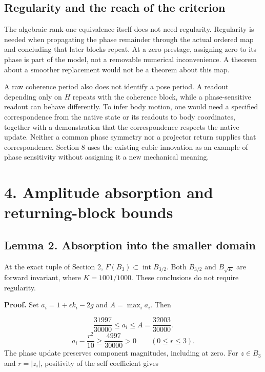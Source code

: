 \documentclass[11pt,a4paper]{article}
\begin{document}
\subsection*{Regularity and the reach of the criterion}
The algebraic rank-one equivalence itself does not need regularity. Regularity is needed when propagating the phase remainder through the actual ordered map and concluding that later blocks repeat. At a zero prestage, assigning zero to its phase is part of the model, not a removable numerical inconvenience. A theorem about a smoother replacement would not be a theorem about this map.

A raw coherence period also does not identify a pose period. A readout depending only on $H$ repeats with the coherence block, while a phase-sensitive readout can behave differently. To infer body motion, one would need a specified correspondence from the native state or its readouts to body coordinates, together with a demonstration that the correspondence respects the native update. Neither a common phase symmetry nor a projector return supplies that correspondence. Section 8 uses the existing cubic innovation as an example of phase sensitivity without assigning it a new mechanical meaning.

\clearpage
\section*{4. Amplitude absorption and returning-block bounds}
\subsection*{Lemma 2. Absorption into the smaller domain}
At the exact tuple of Section 2, $F(B_3)\subset\operatorname{int}B_{3/2}$. Both $B_{3/2}$ and $B_{\sqrt{K}}$ are forward invariant, where $K=1001/1000$. These conclusions do not require regularity. \cite{D03}

\textbf{Proof.} Set $a_i=1+\epsilon k_i-2g$ and $A=\max_i a_i$. Then

\begin{equation}\frac{31997}{30000}\leq a_i\leq A=\frac{32003}{30000}.\end{equation}
\begin{equation}a_i-\frac{r^2}{10}\geq\frac{4997}{30000}>0\qquad(0\leq r\leq3).\end{equation}
The phase update preserves component magnitudes, including at zero. For $z\in B_3$ and $r=|z_i|$, positivity of the self coefficient gives
\end{document}
